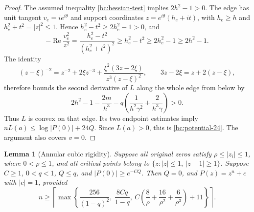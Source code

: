 \documentclass[11pt,reqno]{amsart}
\numberwithin{equation}{section}
\newtheorem{lemma}[theorem]{Lemma}
\theoremstyle{definition}
\theoremstyle{remark}
\renewcommand{\Re}{\operatorname{Re}}
\begin{document}
\begin{proof}
The assumed inequality \eqref{bc:hessian-test} implies $2h^2-1>0$.
The edge has unit tangent $v_e=ie^{i\theta}$ and support coordinates
$z=e^{i\theta}(h_e+it)$, with $h_e\geq h$ and
$h_e^2+t^2=|z|^2\leq1$.  Hence $h_e^2-t^2\geq2h_e^2-1>0$, and
\[
 -\Re\frac{v_e^2}{z^2}
 =\frac{h_e^2-t^2}{(h_e^2+t^2)^2}
 \geq h_e^2-t^2\geq2h_e^2-1\geq2h^2-1.
\]
The identity
\[
 (z-\xi)^{-2}=z^{-2}+2\xi z^{-3}
       +\frac{\xi^2(3z-2\xi)}{z^3(z-\xi)^2},
 \qquad 3z-2\xi=z+2(z-\xi),
\]
therefore bounds the second derivative of $L$ along the whole edge
from below by
\begin{equation}\label{bc:hessian-test}
 2h^2-1-\frac{2m}{h^3}
       -q\left(\frac1{h^2\gamma^2}+\frac2{h^3\gamma}\right)>0.
\end{equation}
Thus $L$ is convex on that edge.  Its two endpoint estimates imply
$nL(a)\leq\log|P(0)|+24Q$.  Since $L(a)>0$, this is
\eqref{bc:potential-24}.  The argument also covers $v=0$.
\end{proof}

\begin{lemma}[Annular cubic rigidity]\label{bc:cubic-rigidity}
Suppose all original zeros satisfy $\rho\leq|z_i|\leq1$, where
$0<\rho\leq1$, and all critical points belong to
$\{z:|z|\leq1,\ |z-1|\geq1\}$.  Suppose $C\geq1$, $0<q<1$,
$Q\leq q$, and $|P(0)|\geq e^{-CQ}$.  Then $Q=0$, and
$P(z)=z^n+c$ with $|c|=1$, provided
\begin{equation}\label{bc:rigidity-floor}
 n\geq\left\lceil\max\left\{
 \frac{256}{(1-q)^2},\ \frac{8Cq}{1-q},\
 C\left(\frac8\rho+\frac{16}{\rho^2}+\frac6{\rho^3}\right)+11
 \right\}\right\rceil.
\end{equation}
\end{lemma}
\end{document}

